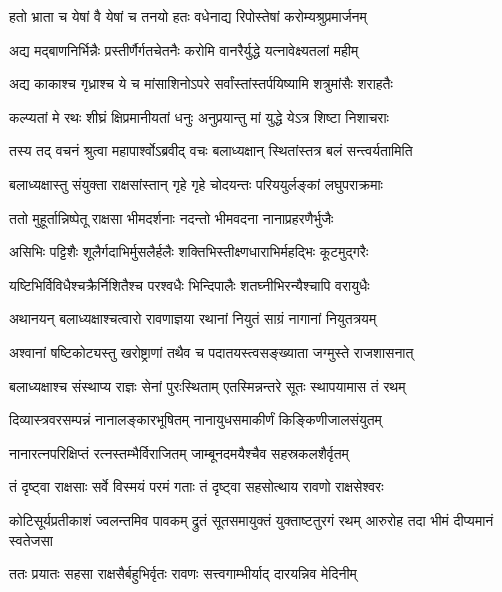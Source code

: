 \twolineshloka
{हतो भ्राता च येषां वै येषां च तनयो हतः}
{वधेनाद्य रिपोस्तेषां करोम्यश्रुप्रमार्जनम्} %

\twolineshloka
{अद्य मद्बाणनिर्भिन्नैः प्रस्तीर्णैर्गतचेतनैः}
{करोमि वानरैर्युद्धे यत्नावेक्ष्यतलां महीम्} %

\twolineshloka
{अद्य काकाश्च गृध्राश्च ये च मांसाशिनोऽपरे}
{सर्वांस्तांस्तर्पयिष्यामि शत्रुमांसैः शराहतैः} %

\twolineshloka
{कल्प्यतां मे रथः शीघ्रं क्षिप्रमानीयतां धनुः}
{अनुप्रयान्तु मां युद्धे येऽत्र शिष्टा निशाचराः} %

\twolineshloka
{तस्य तद् वचनं श्रुत्वा महापार्श्वोऽब्रवीद् वचः}
{बलाध्यक्षान् स्थितांस्तत्र बलं सन्त्वर्यतामिति} %

\twolineshloka
{बलाध्यक्षास्तु संयुक्ता राक्षसांस्तान् गृहे गृहे}
{चोदयन्तः परिययुर्लङ्कां लघुपराक्रमाः} %

\twolineshloka
{ततो मुहूर्तान्निष्पेतू राक्षसा भीमदर्शनाः}
{नदन्तो भीमवदना नानाप्रहरणैर्भुजैः} %

\twolineshloka
{असिभिः पट्टिशैः शूलैर्गदाभिर्मुसलैर्हलैः}
{शक्तिभिस्तीक्ष्णधाराभिर्महद्भिः कूटमुद्गरैः} %

\twolineshloka
{यष्टिभिर्विविधैश्चक्रैर्निशितैश्च परश्वधैः}
{भिन्दिपालैः शतघ्नीभिरन्यैश्चापि वरायुधैः} %

\twolineshloka
{अथानयन् बलाध्यक्षाश्चत्वारो रावणाज्ञया}
{रथानां नियुतं साग्रं नागानां नियुतत्रयम्} %

\twolineshloka
{अश्वानां षष्टिकोट्यस्तु खरोष्ट्राणां तथैव च}
{पदातयस्त्वसङ्ख्याता जग्मुस्ते राजशासनात्} %

\twolineshloka
{बलाध्यक्षाश्च संस्थाप्य राज्ञः सेनां पुरःस्थिताम्}
{एतस्मिन्नन्तरे सूतः स्थापयामास तं रथम्} %

\twolineshloka
{दिव्यास्त्रवरसम्पन्नं नानालङ्कारभूषितम्}
{नानायुधसमाकीर्णं किङ्किणीजालसंयुतम्} %

\twolineshloka
{नानारत्नपरिक्षिप्तं रत्नस्तम्भैर्विराजितम्}
{जाम्बूनदमयैश्चैव सहस्रकलशैर्वृतम्} %

\twolineshloka
{तं दृष्ट्वा राक्षसाः सर्वे विस्मयं परमं गताः}
{तं दृष्ट्वा सहसोत्थाय रावणो राक्षसेश्वरः} %

\threelineshloka
{कोटिसूर्यप्रतीकाशं ज्वलन्तमिव पावकम्}
{द्रुतं सूतसमायुक्तं युक्ताष्टतुरगं रथम्}
{आरुरोह तदा भीमं दीप्यमानं स्वतेजसा} %

\twolineshloka
{ततः प्रयातः सहसा राक्षसैर्बहुभिर्वृतः}
{रावणः सत्त्वगाम्भीर्याद् दारयन्निव मेदिनीम्} %

